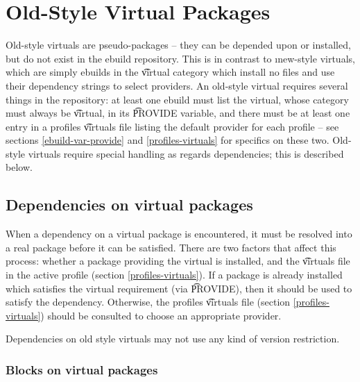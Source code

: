 \chapter{Old-Style Virtual Packages}
\label{old-virtuals}

Old-style virtuals are pseudo-packages -- they can be depended upon or installed, but do not exist
in the ebuild repository. This is in contrast to \i{new-style} virtuals, which are simply ebuilds in
the \t{virtual} category which install no files and use their dependency strings to select
providers. An old-style virtual requires several things in the repository: at least
one ebuild must list the virtual, whose category must always be \t{virtual}, in its \t{PROVIDE}
variable, and there must be at least one entry in a profiles \t{virtuals} file listing the default
provider for each profile -- see sections \ref{ebuild-var-provide} and \ref{profiles-virtuals} for
specifics on these two. Old-style virtuals require special handling as regards dependencies; this is
described below.

\section{Dependencies on virtual packages}

When a dependency on a virtual package is encountered, it must be resolved into a real package
before it can be satisfied. There are two factors that affect this process: whether a package
providing the virtual is installed, and the \t{virtuals} file in the active profile (section
\ref{profiles-virtuals}). If a package is already installed which satisfies the virtual requirement
(via \t{PROVIDE}), then it should be used to satisfy the dependency. Otherwise, the profiles
\t{virtuals} file (section \ref{profiles-virtuals}) should be consulted to choose an appropriate
provider.

Dependencies on old style virtuals may not use any kind of version restriction.

\subsection{Blocks on virtual packages}



